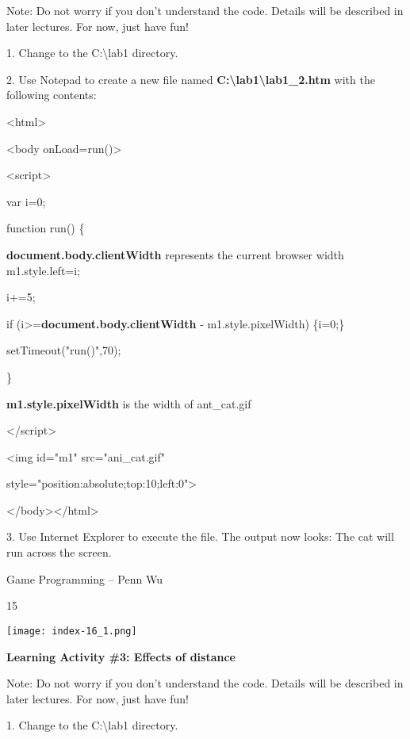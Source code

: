 \documentclass[
]{article}
\begin{document}
\textbf{}

Note: Do not worry if you don't understand the code. Details will be
described in later lectures. For now, just have fun!

\textbf{}

1. Change to the C:\textbackslash lab1 directory.

2. Use Notepad to create a new file named
\textbf{C:\textbackslash lab1\textbackslash lab1\_2.htm} with the
following contents:

\textless html\textgreater{}

\textless body onLoad=run()\textgreater{}

\textless script\textgreater{}

var i=0;

function run() \{

\textbf{document.body.clientWidth} represents the current browser width
m1.style.left=i;

i+=5;

if (i\textgreater=\textbf{document.body.clientWidth} -
m1.style.pixelWidth) \{i=0;\}

setTimeout("run()",70);

\}

\textbf{m1.style.pixelWidth} is the width of ant\_cat.gif

\textless/script\textgreater{}

\textless img id="m1" src="ani\_cat.gif"

style="position:absolute;top:10;left:0"\textgreater{}

\textless/body\textgreater\textless/html\textgreater{}

3. Use Internet Explorer to execute the file. The output now looks: The
cat will run across the screen.

Game Programming -- Penn Wu

15

\protect\hypertarget{index_split_002.htmlux5cux23p16}{}{}\texttt{[image: index-16\_1.png]}

\textbf{}

\textbf{Learning Activity \#3: Effects of distance}

\textbf{}

Note: Do not worry if you don't understand the code. Details will be
described in later lectures. For now, just have fun!

\textbf{}

1. Change to the C:\textbackslash lab1 directory.
\end{document}
